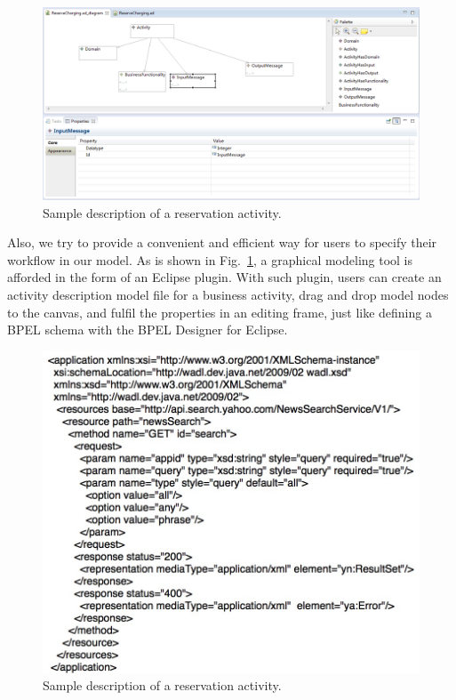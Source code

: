 \begin{figure}[!t]
\centering
\includegraphics[width=1.0\linewidth]{./graph/eclipseplugin}
\caption{Sample description of a reservation activity.}
\label{fig_eclipseplugin}
\end{figure}

Also, we try to provide a convenient and efficient way for users to specify their workflow in our model. As is shown in Fig.~\ref{fig_eclipseplugin}, a graphical modeling tool is afforded in the form of an Eclipse plugin. With such plugin, users can create an activity description model file for a business activity, drag and drop model nodes to the canvas, and fulfil the properties in an editing frame, just like defining a BPEL schema with the BPEL Designer for Eclipse. 

\begin{figure}[!t]
\centering
\includegraphics[width=1.0\linewidth]{./graph/wadl}
\caption{Sample description of a reservation activity.}
\label{fig_wadl}
\end{figure}

